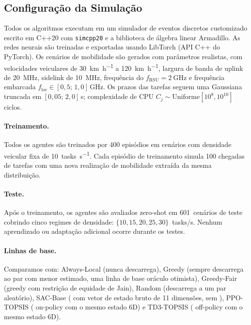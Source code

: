 \subsection{Configuração da Simulação}

Todos os algoritmos executam em um simulador de eventos discretos  customizado escrito em C++20 com \texttt{simcpp20} e a biblioteca de álgebra linear Armadillo. As redes neurais são treinadas e exportadas usando LibTorch (API C++ do PyTorch). Os cenários de mobilidade são gerados com parâmetros  realistas, com velocidades veiculares de \SI{30}{\kilo\meter\per\hour} a \SI{120}{\kilo\meter\per\hour}, largura de banda de uplink  de \SI{20}{\mega\hertz}, sidelink  de \SI{10}{\mega\hertz}, frequência do  $f_{\mathrm{RSU}} = \SI{2}{\giga\hertz}$ e frequência embarcada $f_{\mathrm{loc}} \in [0{,}5;\, 1{,}0]$\,GHz. Os prazos das tarefas seguem uma Gaussiana truncada em $[0{,}05;\, 2{,}0]$\,s; complexidade de CPU $C_j \sim \mathrm{Uniforme}[10^8, 10^{10}]$ ciclos.

\paragraph{Treinamento.} Todos os agentes  são treinados por 400 episódios em cenários com densidade veicular fixa de \SI{10}{tasks\per\second}. Cada episódio de treinamento simula 100 chegadas de tarefas com uma nova realização de mobilidade extraída da mesma distribuição.

\paragraph{Teste.} Após o treinamento, os agentes são avaliados zero-shot em 601~cenários de teste cobrindo cinco regimes de densidade: $\{10, 15, 20, 25, 30\}$~tasks/s. Nenhum aprendizado ou adaptação adicional ocorre durante os testes.

\paragraph{Linhas de base.} Comparamos com: Always-Local (nunca descarrega), Greedy (sempre descarrega ao par  com menor  estimado, uma linha de base oráculo otimista), Greedy-Fair (greedy com restrição de equidade de Jain), Random (descarrega a um par aleatório), SAC-Base ( com vetor de estado bruto de 11 dimensões, sem ), PPO-TOPSIS ( on-policy com o mesmo estado  6D) e TD3-TOPSIS ( off-policy com o mesmo estado  6D).

